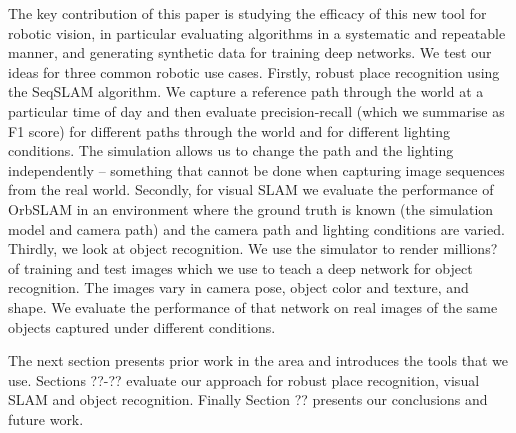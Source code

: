 The key contribution of this paper is studying the efficacy of this new tool for robotic vision, in particular evaluating algorithms in a systematic and repeatable manner, and generating synthetic data for training deep networks.
We test our ideas for three common robotic use cases.
Firstly, robust place recognition using the SeqSLAM\cite{??} algorithm.  We capture a reference path through the world at a particular time of day and then evaluate precision-recall (which we summarise as F1 score) for different paths through the world and for different lighting conditions.  The simulation allows us to change the path and the lighting independently -- something that cannot be done when capturing image sequences from the real world.
Secondly, for visual SLAM we evaluate the performance of OrbSLAM in an environment where the ground truth is known (the simulation model and camera path) and the camera path and lighting conditions are varied.
Thirdly, we look at object recognition.  We use the simulator to render millions? of training and test images which we use to teach a deep network for object recognition.  The images vary in camera pose, object color and texture, and shape.  We evaluate the performance of that network on real images of the same objects captured under different conditions. 

The next section presents prior work in the area and introduces the tools that we use.  Sections ??-?? evaluate our approach for robust place recognition,
visual SLAM and object recognition.  Finally Section ?? presents our conclusions and future work. 

